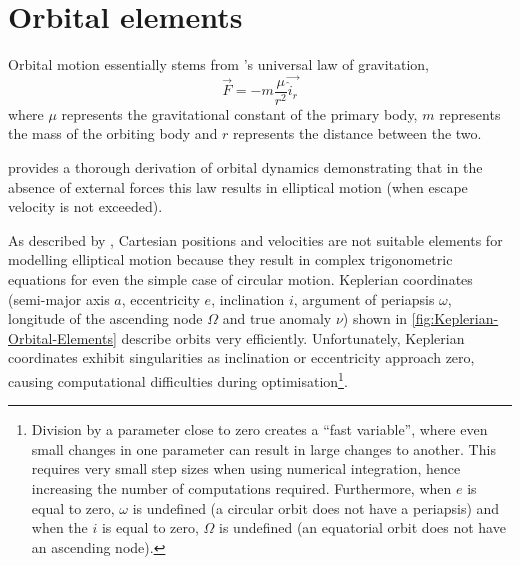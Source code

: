 \section{Orbital elements} \label{sec:Orbital-Elements}

Orbital motion essentially stems from \textcite{Newton1687}'s universal law of gravitation, 
\begin{equation}
\vec{F}=-m\frac{\mu}{r^{2}}\vec{\hat{i}_{r}} \label{eq:Fgravity}
\end{equation}
where $\mu$ represents the gravitational constant of the primary body, $m$  represents the mass of the orbiting body and $r$ represents the distance between the two.
 
\textcite{Kaplan1976} provides a thorough derivation of orbital dynamics demonstrating that in the absence of external forces this law results in elliptical motion (when escape velocity is not exceeded). %

As described by \textcite{Letterio_thesis}, Cartesian positions and velocities are not suitable elements for modelling elliptical motion because they result in complex trigonometric equations for even the simple case of circular motion. Keplerian coordinates (semi-major axis $a$, eccentricity $e$, inclination $i$, argument of periapsis $\omega$, longitude of the ascending node $\Omega$ and true anomaly $\nu$) shown in \autoref{fig:Keplerian-Orbital-Elements} describe orbits very efficiently. Unfortunately, Keplerian coordinates exhibit singularities as inclination or eccentricity approach zero, causing computational difficulties during optimisation\footnote{Division by a parameter close to zero creates a \enquote{fast variable}, where even small changes in one parameter can result in large changes to another. This requires very small step sizes when using numerical integration, hence increasing the number of computations required. Furthermore, when $e$ is equal to zero, $\omega$ is undefined (a circular orbit does not have a periapsis) and when the $i$ is equal to zero, $\Omega$ is undefined (an equatorial orbit does not have an ascending node).}.

